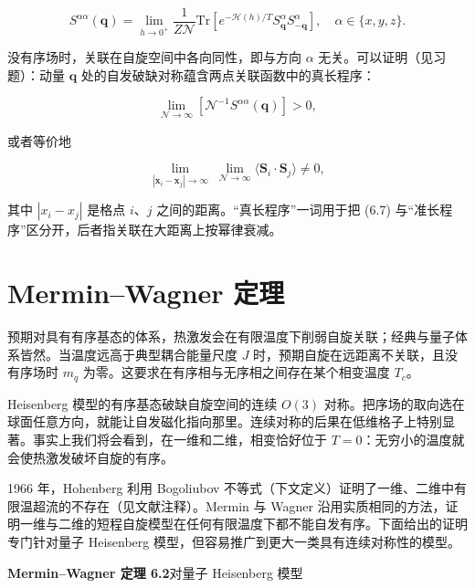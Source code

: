 \begin{equation*}
S ^ {\alpha \alpha} ( \mathbf {q} ) = \lim _ {h \to 0 ^ {+}} \frac {1}{Z \mathcal {N}} \mathrm{Tr} \left[ e ^ {- \mathcal {H} ( h ) / T} S _ {\mathbf {q}} ^ {\alpha} S _ {- \mathbf {q}} ^ {\alpha} \right] , \quad \alpha \in \{ x, y, z \}.
\tag{6.5}
\end{equation*}

没有序场时，关联在自旋空间中各向同性，即与方向 $\alpha$ 无关。可以证明（见习题）：动量 $\mathbf{q}$ 处的自发破缺对称蕴含两点关联函数中的真长程序：

\begin{equation*}
\lim _ {\mathcal {N} \rightarrow \infty} \left[ \mathcal {N} ^ {- 1} S ^ {\alpha \alpha} ( \mathbf {q} ) \right] > 0 ,
\tag{6.6}
\end{equation*}

或者等价地

\begin{equation*}
\lim _ {| \mathbf {x} _ {i} - \mathbf {x} _ {j} | \to \infty} \; \lim _ {\mathcal {N} \to \infty} \langle \mathbf {S} _ {i} \cdot \mathbf {S} _ {j} \rangle \neq 0 ,
\tag{6.7}
\end{equation*}

其中 $|x_{i}-x_{j}|$ 是格点 $i$、$j$ 之间的距离。“真长程序”一词用于把 (6.7) 与“准长程序”区分开，后者指关联在大距离上按幂律衰减。

\section{Mermin--Wagner 定理}

预期对具有有序基态的体系，热激发会在有限温度下削弱自旋关联；经典与量子体系皆然。当温度远高于典型耦合能量尺度 $J$ 时，预期自旋在远距离不关联，且没有序场时 $m_{q}$ 为零。这要求在有序相与无序相之间存在某个相变温度 $T_{c}$。

Heisenberg 模型的有序基态破缺自旋空间的连续 $O(3)$ 对称。把序场的取向选在球面任意方向，就能让自发磁化指向那里。连续对称的后果在低维格子上特别显著。事实上我们将会看到，在一维和二维，相变恰好位于 $T=0$：无穷小的温度就会使热激发破坏自旋的有序。

1966 年，Hohenberg 利用 Bogoliubov 不等式（下文定义）证明了一维、二维中有限温超流的不存在（见文献注释）。Mermin 与 Wagner 沿用实质相同的方法，证明一维与二维的短程自旋模型在任何有限温度下都不能自发有序。下面给出的证明专门针对量子 Heisenberg 模型，但容易推广到更大一类具有连续对称性的模型。

\medskip
\noindent\textbf{Mermin--Wagner 定理 6.2}\quad 对量子 Heisenberg 模型

